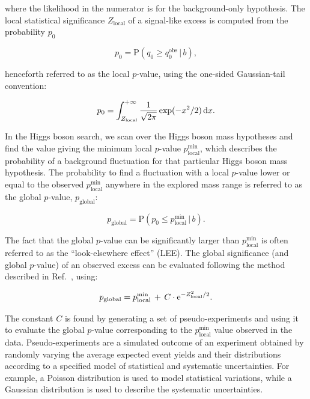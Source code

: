 \documentclass[11pt,twoside,a4paper,cmspaper,final,collab]{cms-tdr}
\begin{document}
where the likelihood in the numerator is for the background-only hypothesis.
The local statistical significance $Z_\text{local}$ of a signal-like excess is computed from the probability $p_0$

\begin{equation}
p_0 = \mathrm{P}(q_0 \geq q_0^\text{obs} \, | \, b),
\end{equation}

henceforth referred to as the local $p$-value, using the one-sided Gaussian-tail convention:

\begin{equation}
\label{eq:Z}
p_0 = \int_{Z_{\text{local}}}^{+\infty} \frac{1}{\sqrt{2\pi}} \exp(-x^2/2) \, \mathrm{d} x.
\end{equation}


In the Higgs boson search, we scan over the Higgs boson mass hypotheses and
find the value giving the minimum local $p$-value $p_{\text{local}}^{\text{min}}$,
which describes the probability of a background fluctuation for that particular Higgs boson mass
hypothesis. The probability to find a fluctuation with a local $p$-value lower or equal to the observed
$p_{\text{local}}^{\text{min}}$ anywhere in the explored mass range
is referred to as the global $p$-value, $p_{\text{global}}$:

\begin{equation}
p_{\mathrm{global}}= \mathrm{P}(p_0 \leq p_{\text{local}}^{\text{min}} \, | \, b).
\end{equation}

The fact that the global $p$-value can be significantly larger than $p_{\text{local}}^{\text{min}}$
is often referred to as the ``look-elsewhere effect'' (LEE).
The global significance (and global $p$-value) of an observed excess can be evaluated
following the method described in Ref.~\cite{LEE}, using:

\begin{equation}
\label{eq:LEE1}
p_{\text{global}}= p_{\text{local}}^{\text{min}} \, + \, C \cdot \mathrm{e}^{ - Z^2_{\text{local}} / 2 }.
\end{equation}

The constant $C$ is found by generating a set of pseudo-experiments and using it to
evaluate the global $p$-value corresponding to the $p_{\mathrm{local}}^{\mathrm{min}}$
value observed in the data. Pseudo-experiments are a simulated outcome of an experiment obtained by randomly varying the
average expected event yields and their distributions according to a specified model of statistical and
systematic uncertainties.
For example, a Poisson distribution is used to model statistical variations,
while a Gaussian distribution is used to describe the systematic uncertainties.
\end{document}
